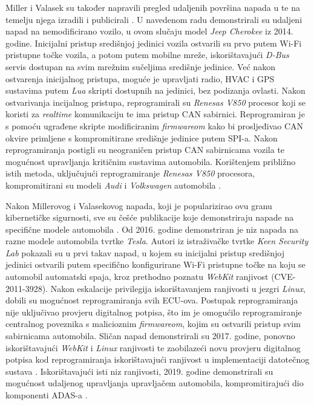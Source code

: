 \documentclass[times, utf8, diplomski, numeric]{fer}
\begin{document}
Miller i Valasek su također napravili pregled udaljenih površina napada u \cite{miller2014survey} te na temelju njega izradili i publicirali \cite{miller2015remote}. U navedenom radu demonstrirali su udaljeni napad na nemodificirano vozilo, u ovom slučaju model \textit{Jeep Cherokee} iz 2014. godine. Inicijalni pristup središnjoj jedinici vozila ostvarili su prvo putem Wi-Fi pristupne točke vozila, a potom putem mobilne mreže, iskorištavajući \textit{D-Bus} servis dostupan na svim mrežnim sučeljima središnje jedinice. Već nakon ostvarenja inicijalnog pristupa, moguće je upravljati radio, HVAC i GPS sustavima putem \textit{Lua} skripti dostupnih na jedinici, bez podizanja ovlasti. Nakon ostvarivanja incijalnog pristupa, reprogramirali su \textit{Renesas V850} procesor koji se koristi za \textit{realtime} komunikaciju te ima pristup CAN sabirnici. Reprogramiran je s pomoću ugrađene skripte modificiranim \textit{firmwareom} kako bi prosljeđivao CAN okvire primljene s kompromitirane središnje jedinice putem SPI-a. Nakon reprogramiranja postigli su neograničen pristup CAN sabirnicama vozila te mogućnost upravljanja kritičnim sustavima automobila. Korištenjem približno istih metoda, uključujući reprogramiranje \textit{Renesas V850} procesora, kompromitirani su modeli \textit{Audi} i \textit{Volkswagen} automobila \cite{computest2018connected}.

Nakon Millerovog i Valasekovog napada, koji je popularizirao ovu granu kibernetičke sigurnosti, sve su češće publikacije koje demonstriraju napade na specifične modele automobila \cite{dissecto2023popular}. Od 2016. godine demonstriran je niz napada na razne modele automobila tvrtke \textit{Tesla}. Autori iz istraživačke tvrtke \textit{Keen Security Lab} pokazali su u \cite{tencent2016tesla} prvi takav napad, u kojem su inicijalni pristup središnjoj jedinici ostvarili putem specifično konfigurirane Wi-Fi pristupne točke na koju se automobil automatski spaja, kroz prethodno poznatu \textit{WebKit} ranjivost (CVE-2011-3928). Nakon eskalacije privilegija iskorištavanjem ranjivosti u jezgri \textit{Linux}, dobili su mogućnost reprogramiranja svih ECU-ova. Postupak reprogramiranja nije uključivao provjeru digitalnog potpisa, što im je omogućilo reprogramiranje centralnog poveznika s malicioznim \textit{firmwareom}, kojim su ostvarili pristup svim sabirnicama automobila. Sličan napad demonstrirali su 2017. godine, ponovno iskorištavajući \textit{WebKit} i \textit{Linux} ranjivosti te zaobilazeći novu provjeru digitalnog potpisa kod reprogramiranja iskorištavajući ranjivost u implementaciji datotečnog sustava \cite{tencent2017free}. Iskorištavajući isti niz ranjivosti, 2019. godine demonstrirali su mogućnost udaljenog upravljanja upravljačem automobila, kompromitirajući dio komponenti ADAS-a \cite{tencent2019tesla}.
\end{document}

